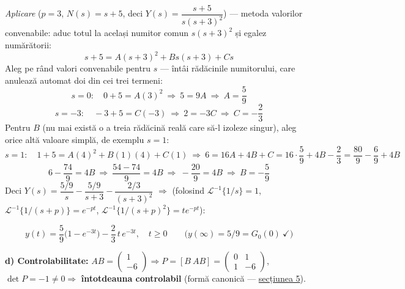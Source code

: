 \documentclass[10pt,a4paper]{article}
\begin{document}
\textit{Aplicare} ($p{=}3$, $N(s){=}s+5$, deci $Y(s){=}\dfrac{s+5}{s(s+3)^2}$) — metoda valorilor convenabile: aduc totul la același numitor comun $s(s+3)^2$ și egalez numărătorii:
$$s+5=A(s+3)^2+Bs(s+3)+Cs$$
Aleg pe rând valori convenabile pentru $s$ — întâi rădăcinile numitorului, care anulează automat doi din cei trei termeni:
$$s=0:\quad 0+5=A(3)^2\ \Rightarrow\ 5=9A\ \Rightarrow\ A=\dfrac59$$
$$s=-3:\quad{-}3+5=C(-3)\ \Rightarrow\ 2=-3C\ \Rightarrow\ C=-\dfrac23$$
Pentru $B$ (nu mai există o a treia rădăcină reală care să-l izoleze singur), aleg orice altă valoare simplă, de exemplu $s{=}1$:
$$s=1:\quad 1+5=A(4)^2+B(1)(4)+C(1)\ \Rightarrow\ 6=16A+4B+C=16\cdot\dfrac59+4B-\dfrac23=\dfrac{80}9-\dfrac69+4B$$
$$6-\dfrac{74}9=4B\ \Rightarrow\ \dfrac{54-74}9=4B\ \Rightarrow\ -\dfrac{20}9=4B\ \Rightarrow\ B=-\dfrac59$$
Deci $Y(s){=}\dfrac{5/9}s-\dfrac{5/9}{s+3}-\dfrac{2/3}{(s+3)^2}$ $\Rightarrow$ (folosind $\mathcal L^{-1}\{1/s\}{=}1$, $\mathcal L^{-1}\{1/(s+p)\}{=}e^{-pt}$, $\mathcal L^{-1}\{1/(s+p)^2\}{=}te^{-pt}$):
\begin{keyeq}\color{red!65!black}
$$y(t)=\dfrac59\big(1-e^{-3t}\big)-\dfrac23\,t\,e^{-3t},\quad t\ge0\qquad\big(y(\infty){=}5/9{=}G_0(0)\ \checkmark\big)$$
\end{keyeq}

\textbf{d) Controlabilitate:} $AB{=}\begin{pmatrix}1\\-6\end{pmatrix}\Rightarrow P{=}[B\ AB]{=}\begin{pmatrix}0&1\\1&-6\end{pmatrix}$, $\det P{=}-1\ne0\Rightarrow$ \textbf{întotdeauna controlabil} (formă canonică — \hyperref[sec:5]{secțiunea 5}).
\end{document}

